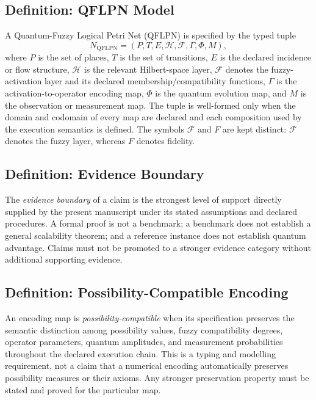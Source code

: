 \documentclass[final,3p,times]{elsarticle}
\begin{document}
\subsection{Definition: QFLPN Model}
A Quantum-Fuzzy Logical Petri Net (QFLPN) is specified by the typed tuple
\begin{equation}
  N_{\mathrm{QFLPN}}=(P,T,E,\mathcal{H},\mathcal{F},\Gamma,\Phi,M),
\end{equation}
where $P$ is the set of places, $T$ is the set of transitions, $E$ is the declared incidence or flow structure, $\mathcal{H}$ is the relevant Hilbert-space layer, $\mathcal{F}$ denotes the fuzzy-activation layer and its declared membership/compatibility functions, $\Gamma$ is the activation-to-operator encoding map, $\Phi$ is the quantum evolution map, and $M$ is the observation or measurement map. The tuple is well-formed only when the domain and codomain of every map are declared and each composition used by the execution semantics is defined. The symbols $\mathcal{F}$ and $F$ are kept distinct: $\mathcal{F}$ denotes the fuzzy layer, whereas $F$ denotes fidelity.

\subsection{Definition: Evidence Boundary}
The \emph{evidence boundary} of a claim is the strongest level of support directly supplied by the present manuscript under its stated assumptions and declared procedures. A formal proof is not a benchmark; a benchmark does not establish a general scalability theorem; and a reference instance does not establish quantum advantage. Claims must not be promoted to a stronger evidence category without additional supporting evidence.

\subsection{Definition: Possibility-Compatible Encoding}
An encoding map is \emph{possibility-compatible} when its specification preserves the semantic distinction among possibility values, fuzzy compatibility degrees, operator parameters, quantum amplitudes, and measurement probabilities throughout the declared execution chain. This is a typing and modelling requirement, not a claim that a numerical encoding automatically preserves possibility measures or their axioms. Any stronger preservation property must be stated and proved for the particular map.
\end{document}
